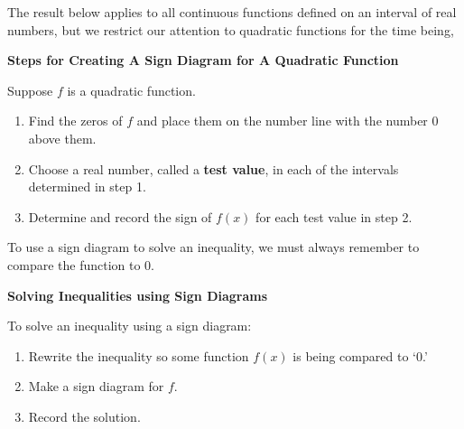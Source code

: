 \documentclass{ximera}
\begin{document}
\medskip

The result below applies to all continuous functions defined on an interval of real numbers, but we restrict our attention to quadratic functions for the time being,

\medskip


\centerline{\textbf{Steps for Creating A Sign Diagram for A Quadratic Function}} 

\smallskip

Suppose $f$ is a quadratic function.

\begin{enumerate}

\item  Find the zeros of $f$ and place them on the number line with the number $0$ above them.

\item  Choose a real number, called a \textbf{test value}, in each of the intervals determined in step 1. 

\item  Determine and record the sign of $f(x)$ for each test value in step 2.

\end{enumerate}


\medskip

To use a sign diagram to solve an inequality, we must always remember to compare the function to $0$.

\medskip


\centerline{\textbf{Solving Inequalities using Sign Diagrams}} 

\smallskip

To solve an inequality using a sign diagram:

\begin{enumerate}

\item  Rewrite the inequality so some function $f(x)$ is being compared to `$0$.'

\item  Make a sign diagram for $f$.

\item  Record the solution.

\end{enumerate}
\end{document}
